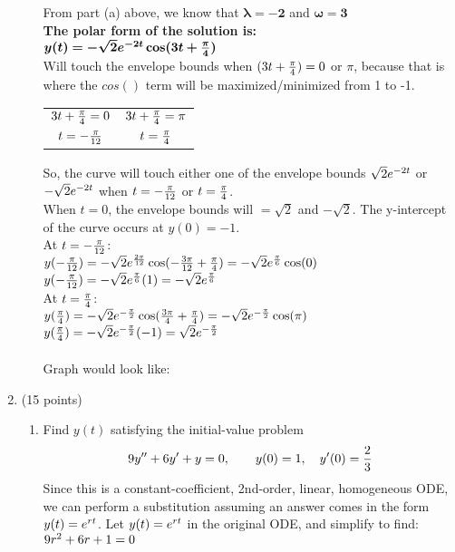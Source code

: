 \documentclass{article}
\begin{document}
\begin{enumerate}
\begin{enumerate}
From part (a) above, we know that $\bm{\lambda = -2}$ and $\bm{\omega = 3}$\\

\textbf{The polar form of the solution is:}\\
$\bm{y(t)=-\sqrt{2}e\sp{-2t}\cos(3t+{\pi\over4})} $\\

Will touch the envelope bounds when $(3t+{\pi\over4})=0$ or $\pi$, because that is where the $cos()$ term will be maximized/minimized from 1 to -1.\\
\begin{tabular}{ c c } 
 $3t+{\pi\over4}=0$ & $3t+{\pi\over4}=\pi$ \\ 
 $t=-{\pi\over12}$ & $t={\pi\over4}$ \\ 
\end{tabular}

So, the curve will touch either one of the envelope bounds $\sqrt{2}e\sp{-2t}$ or $-\sqrt{2}e\sp{-2t}$ when $t = -{\pi\over12}$ or $t={\pi\over4}$.\\
When $t=0$, the envelope bounds will $= \sqrt{2}$ and $-\sqrt{2}$. The y-intercept of the curve occurs at $y(0) = -1$.\\

At $t = -{\pi\over12}$:\\
$y(-{\pi\over12})=-\sqrt{2}e\sp{2\pi \over 12}\cos(-{3\pi \over 12}+{\pi\over4}) = -\sqrt{2}e\sp{\pi \over 6}\cos(0)$\\
$y(-{\pi\over12})=-\sqrt{2}e\sp{\pi \over 6}(1) = -\sqrt{2}e\sp{\pi \over 6}$\\

At $t = {\pi\over4}$:\\
$y({\pi\over4})=-\sqrt{2}e\sp{-{\pi\over2}}\cos({3\pi\over4}+{\pi\over4}) = -\sqrt{2}e\sp{-{\pi\over2}}\cos(\pi)$\\
$y({\pi\over4})= -\sqrt{2}e\sp{-{\pi\over2}}(-1) = \sqrt{2}e\sp{-{\pi\over2}}$\\\\

Graph would look like:\\
\begin{figure}[h]
\centering
\end{figure}

\end{enumerate}


\newpage
\item (15 points)
\begin{enumerate}
\item
Find $y(t)$ satisfying the initial-value problem
\[
9y\sp{\prime\prime}+6y\sp\prime+y=0,\qquad y(0)=1,\quad y\sp\prime(0)={2\over3}
\]
Since this is a constant-coefficient, 2nd-order, linear, homogeneous ODE, we can perform a substitution assuming an answer comes in the form $y(t)=e\sp{rt}$. Let $y(t)=e\sp{rt}$ in the original ODE, and simplify to find:\\
$9r\sp{2} + 6r + 1 = 0$\\


\end{enumerate}
\end{enumerate}
\end{document}
